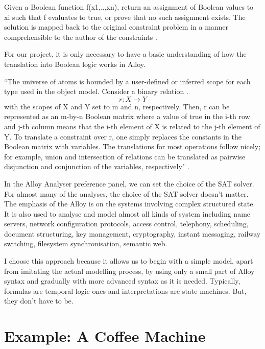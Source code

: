 \documentclass[a4paper,10pt]{report}
\begin{document}
Given a Boolean function f(x1,..,xn), return an assignment of Boolean values to xi such that f evaluates to true, or prove that no such assignment exists. The solution is mapped back to the original constraint problem in a manner comprehensible to the author of the constraints \cite{Yeung2005}.

For our project, it is only necessary to have a basic understanding of how the translation into Boolean logic works in Alloy. 
 
``The universe of atoms is bounded by a user-defined or inferred scope for each type used in the object model. Consider a binary relation .
\begin{equation}
r : X \rightarrow Y
\end{equation} with the scopes of X and Y set to m and n, respectively. Then, r can be represented as an m-by-n Boolean matrix where a value of true in the i-th row and j-th column means that the i-th element of X is related to the j-th element of Y. To translate a constraint over r, one simply replaces the constants in the Boolean matrix with variables. The translations for most operations follow nicely; for example, union and intersection of relations can be translated as pairwise disjunction and conjunction of the variables, respectively" \cite{Yeung2005}.

In the Alloy Analyser preference panel, we can set the choice of the SAT solver. For almost many of the analyses, the choice of the SAT solver doesn't matter. The emphasis of the Alloy is on the systems involving complex structured state. It is also used to analyse and model almost all kinds of system including name servers, network configuration protocols, access control, telephony, scheduling, document structuring, key management, cryptography, instant messaging, railway switching, filesystem synchronisation, semantic web. 

I choose this approach because it allows us to begin with a simple model, apart from imitating the actual modelling process, by using only a small part of Alloy syntax and gradually with more advanced syntax as it is needed. Typically, formulas are temporal logic ones and interpretations are state machines. But, they don't have to be.

\section{Example: A Coffee Machine} 
\label{Ex: Coffee machine}
\end{document}
